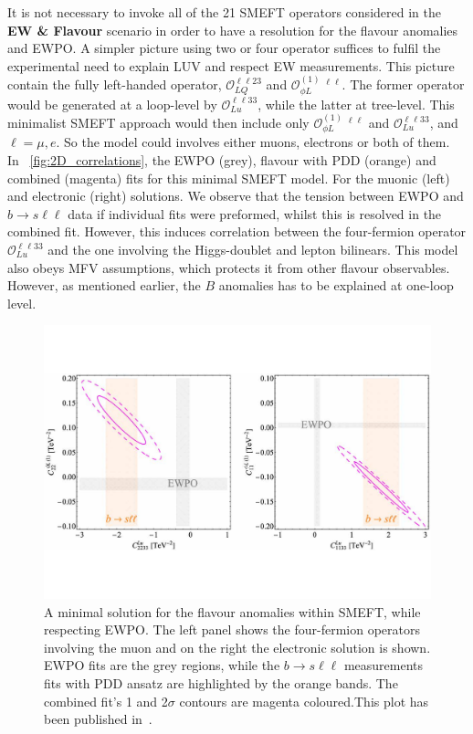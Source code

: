 It is not necessary to invoke all of the 21 SMEFT operators considered in the {\bf EW \& Flavour} scenario in order to have a resolution for the flavour anomalies and EWPO. A simpler picture using two or four operator suffices to fulfil the experimental need to explain LUV and respect EW measurements. This picture contain the fully left-handed operator, $\mathcal{O}_{LQ}^{\ell \ell 2 3}$ and $\mathcal{O}_{\phi L}^{(1)} \ ^{\ell \ell}$. The former operator would be generated at a loop-level by $\mathcal{O}_{Lu}^{\ell \ell 3 3}$, while the latter at tree-level.  This minimalist SMEFT approach would then include only  $\mathcal{O}_{\phi L}^{(1)} \ ^{\ell \ell}$ and $\mathcal{O}_{Lu}^{\ell \ell 3 3}$, and $\ell= \mu, e$. So the model could involves either muons, electrons or both of them.\\ 
In~ \autoref{fig:2D_correlations}, the EWPO (grey), flavour with PDD (orange) and combined (magenta) fits for this minimal SMEFT model. For the muonic (left) and electronic (right) solutions. We observe that the tension between EWPO and $b \to s \ell \ell$ data if individual fits were preformed, whilst this is resolved in the combined fit. However, this induces correlation between the four-fermion operator $\mathcal{O}_{Lu}^{\ell \ell 3 3}$ and the one involving the Higgs-doublet and lepton bilinears. This model also obeys MFV assumptions, which protects it from other flavour observables. However, as mentioned earlier, the $B$ anomalies has to be explained at one-loop level. 
\begin{figure}[htpb!]
	\includegraphics[width=\textwidth]{figures/CHL_CLu.pdf}
	\caption{ A minimal solution for the flavour anomalies within SMEFT, while respecting EWPO. The left panel shows the four-fermion operators involving the muon and on the right the electronic solution is shown. EWPO fits are the grey regions, while the $b \to s\ell \ell$ measurements fits with PDD ansatz are highlighted by the orange bands. The combined fit's 1 and 2$\sigma$ contours are magenta coloured.This plot has been published in~\cite{Alasfar:2020mne}.  } 
	\label{fig:2D_correlations}
\end{figure}

